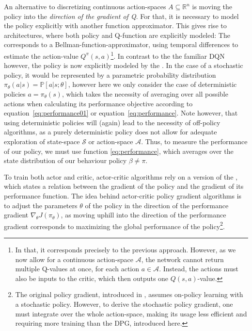 \noindent An alternative to discretizing continuous action-spaces \mbox{$A \subseteq \mathds{R}^n$} is moving the policy into the \textit{direction of the gradient of Q}. For that, it is necessary to model the policy explicitly with another function approximator. This gives rise to  architectures, where both policy and Q-function are explicitly modeled: The  corresponds to a Bellman-function-approximator, using temporal differences to estimate the action-value $Q^\pi(s,a)$\footnote{In that, it corresponds precisely to the previous approach. However, as we now allow for a continuous action-space $\mathcal{A}$, the network cannot return multiple Q-values at once, for each action $a \in \mathcal{A}$. Instead, the actions must also be inputs to the critic, which then outputs one $Q(s,a)$-value.}. In contrast to the the familiar DQN however, the policy is now explicitly modeled by the . In the case of a stochastic policy, it would be represented by a parametric probability distribution $\pi_\theta(a|s) = \mathds{P}[a|s;\theta]$, however here we only consider the case of deterministic policies $a = \pi_\theta(s)$, which takes the necessity of averaging over all possible actions when calculating its performance objective according to equation~\ref{eq:performance01} or equation~\ref{eq:performance}. Note however, that using deterministic policies will (again) lead to the necessity of off-policy algorithms, as a purely deterministic policy does not allow for adequate exploration of state-space $\mathcal{S}$ or action-space $\mathcal{A}$. Thus, to measure the performance of our policy, we must use function \ref{eq:performance}, which averages over the state distribution of our behaviour policy $\beta \neq \pi$. 

To train both actor and critic, actor-critic algorithms rely on a version of the , which states a relation between the gradient of the policy and the gradient of its performance function. The idea behind actor-critic policy gradient algorithms is to adjust the parameters $\theta$ of the policy in the direction of the performance gradient $\nabla_{\theta}J(\pi_\theta)$, as moving uphill into the direction of the performance gradient corresponds to maximizing the global performance of the policy\footnote{The original policy gradient, introduced in \cite{sutton_policy_2000}, assumes on-policy learning with a stochastic policy. However, to derive the stochastic policy gradient, one must integrate over the whole action-space, making its usage less efficient and requiring more training than the DPG, introduced here.}. 

